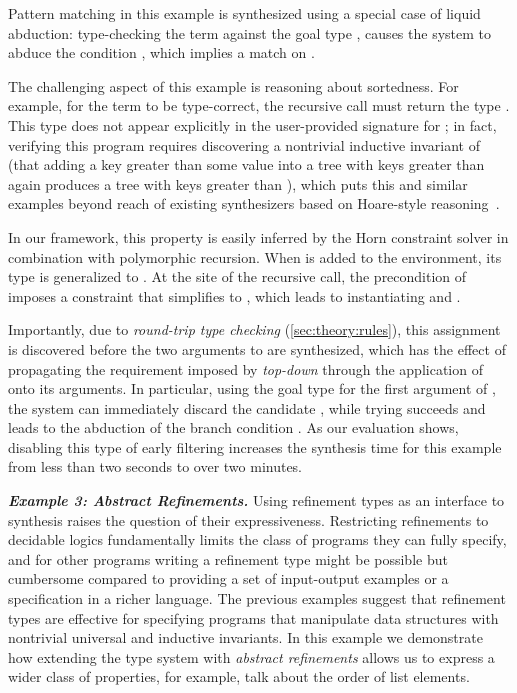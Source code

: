 \documentclass[10pt,preprint]{sigplanconf-pldi16}
\theoremstyle{definition}
\newcommand{\custompar}[1]{\parskip 0pt \textbf{\textit{#1}}}
\begin{document}
Pattern matching in this example is synthesized using a special case of liquid abduction:
type-checking the term  against the goal type ,
causes the system to abduce the condition ,
which implies a match on .

The challenging aspect of this example is reasoning about sortedness.
For example, for the term  to be type-correct,
the recursive call must return the type .
This type does not appear explicitly in the user-provided signature for ;
in fact, verifying this program requires discovering a nontrivial inductive invariant of 
(that adding a key greater than some value  into a tree with keys greater than  again produces a tree with keys greater than ),
which puts this and similar examples beyond reach of existing synthesizers based on Hoare-style reasoning~\cite{LeinoMi12,KneussKuKuSu13}.

In our framework, this property is easily inferred by the Horn constraint solver in combination with polymorphic recursion.
When  is added to the environment, 
its type is generalized to .
At the site of the recursive call, the precondition of  imposes a constraint that simplifies to ,
which leads to instantiating  and .

Importantly, due to \emph{round-trip type checking} (\autoref{sec:theory:rules}), 
this assignment is discovered before the two arguments to  are synthesized,
which has the effect of propagating the requirement imposed by  \emph{top-down} through the application of  onto its arguments.
In particular, using the goal type  for the first argument of ,
the system can immediately discard the candidate ,
while trying  succeeds and leads to the abduction of the branch condition .
As our evaluation shows, disabling this type of early filtering increases the synthesis time for this example from less than two seconds to over two minutes.

\custompar{Example 3: Abstract Refinements.}
Using refinement types as an interface to synthesis raises the question of their expressiveness.
Restricting refinements to decidable logics fundamentally limits the class of programs they can fully specify,
and for other programs writing a refinement type might be possible but cumbersome compared to providing a set of input-output examples or a specification in a richer language.
The previous examples suggest that refinement types are effective for specifying programs that manipulate data structures
with nontrivial universal and inductive invariants.
In this example we demonstrate how extending the type system with \emph{abstract refinements} allows us to express a wider class of properties,
for example, talk about the order of list elements.
\end{document}
